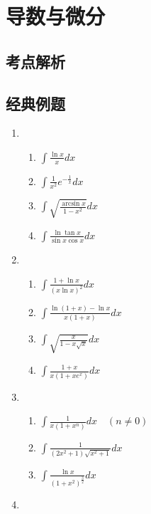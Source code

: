 \chapter{导数与微分}
\section{考点解析} %
\label{sec:考点解析}


\section{经典例题} %
\label{sec:经典例题}

\begin{enumerate}[{例}1.]
    \item   \begin{enumerate}[(1)]
                \item $\int \frac{\ln x}{x}dx$
                \item $\int \frac{1}{x^2}e^{-\frac{1}{x}}dx$
                \item $\int \sqrt{\frac{\arcsin x}{1-x^2}}dx$
                \item $\int \frac{\ln \tan x}{\sin x \cos x}dx$
            \end{enumerate}
    \item   \begin{enumerate}[(1)]
                \item $\int \frac{1+\ln x}{(x\ln x)^2}dx$
                \item $\int \frac{\ln (1+x)-\ln x}{x(1+x)}dx$
                \item $\int \sqrt{\frac{x}{1-x\sqrt{x}}}dx$
                \item $\int \frac{1+x}{x(1+xe^x)}dx$
            \end{enumerate}
    \item   \begin{enumerate}[(1)]
                \item $\int \frac{1}{x(1+x^n)}dx \quad (n \neq 0)$
                \item $\int \frac{1}{(2x^2+1)\sqrt{x^2+1}}dx$
                \item $\int \frac{\ln x}{(1+x^2)^{\frac{3}{2}}}dx$
            \end{enumerate}
    \item   \begin{enumerate}[(1)]

\end{enumerate}
\end{enumerate}
